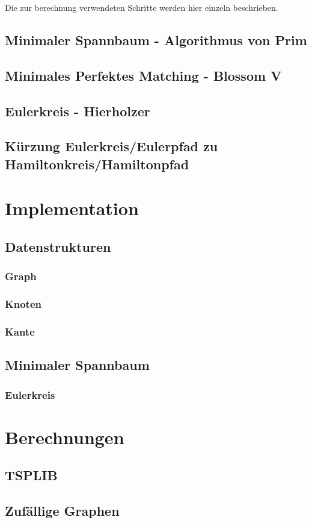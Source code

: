 \documentclass[a4paper]{article}
\begin{document}
Die zur berechnung verwendeten Schritte werden hier einzeln beschrieben.

\subsection{Minimaler Spannbaum - Algorithmus von Prim}


\subsection{Minimales Perfektes Matching - Blossom V}
\subsection{Eulerkreis - Hierholzer}
\subsection{Kürzung Eulerkreis/Eulerpfad zu Hamiltonkreis/Hamiltonpfad}
\newpage
\section{Implementation}
\subsection{Datenstrukturen}
\subsubsection{Graph}
\subsubsection{Knoten}
\subsubsection{Kante}
\subsection{Minimaler Spannbaum}
\subsubsection{Eulerkreis}

\newpage

\section{Berechnungen}
\subsection{TSPLIB}
\subsection{Zufällige Graphen}

\newpage



\end{document}
